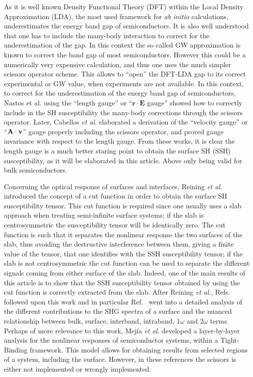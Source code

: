 \documentclass[floatfix,prb,aps,superscriptaddress,11pt,preprint,letterpaper]{revtex4}
\begin{document}
As it is well known
Density Functional Theory (DFT) within the Local Density Approximation
(LDA),\cite{kohnPR65} the most 
used framework for \textit{ab initio} calculations,
underestimates the energy band gap of semiconductors. It is also well
understood that one has to include the many-body interaction to
correct for the underestimation of the gap. In this context the so
called GW approximation\cite{onidaRMP02} is known to correct the band
gap of most semiconductors\cite{luceroJPCM12}. However this could be a numerically very
expensive calculation, and thus one uses the much simpler scissors
operator scheme.%
This allows to ``open'' the DFT-LDA gap to
its correct experimental or GW value, when experiments are not available. 
In this context,
to correct for the underestimation of the energy band gap of semiconductors, 
Nastos et al.\cite{nastosPRB05} 
using the 
``length gauge'' or 
``$\mathbf{r}\cdot\mathbf{E}$ gauge'' 
showed how to correctly include in the SH susceptibility the many-body corrections through the
scissors operator.
Later,
Cabellos \textit{et al}.\cite{cabellosPRB09} 
elaborated a derivation of the ``velocity gauge'' or
``$\mathbf{A}\cdot\mathbf{v}$'' gauge properly including the scissors
operator, and proved  gauge 
invariance with respect to the length gauge.
From these works, it is clear the length gauge is a much better staring
point to obtain the surface SH (SSH) susceptibility, as it will be
elaborated in this article. Above only being valid for bulk semiconductors.

Concerning the optical response of surfaces and interfaces,
Reining \textit{et al.}\cite{reiningPRB94}  
introduced the concept of a 
cut function in order to obtain the surface SH 
susceptibility tensor.
This cut function is required since one usually uses a slab approach
when treating semi-infinite surface systems; if the slab is
centrosymmetric the susceptibility tensor will be identically zero.
The cut function is such that it separates the nonlinear response
 the two surfaces of the slab, thus avoiding the destructive
 interference between them, giving a finite value of the tensor, that
 one identifies with the SSH susceptibility tensor; if the slab is not
 centrosymmetric the cut function can be used to separate the
 different signals coming from either surface of the slab.
Indeed, one of the main results of this article is to show that the SSH 
susceptibility tensor obtained by using the cut function is 
correctly extracted from the slab.   
After Reining \textit{et al.}\cite{reiningPRB94}, 
Refs.~
followed upon this work and in particular Ref.~
went into a detailed analysis of the different contributions to the 
SHG spectra of a surface and the nuanced relationship between bulk, 
surface, interband, intraband, $1\omega$ and $2\omega$ terms. 
Perhaps of more relevance to this work, 
Mej\'ia \textit{et al}.\cite{mejiaRMF04} developed a layer-by-layer analysis for 
the nonlinear responses of semiconductor systems, within a 
Tight-Binding framework. This model 
allows for obtaining results from selected regions of a system,
including the surface. 
However, in these references the scissors is either not implemented or
wrongly implemented. 
\end{document}
